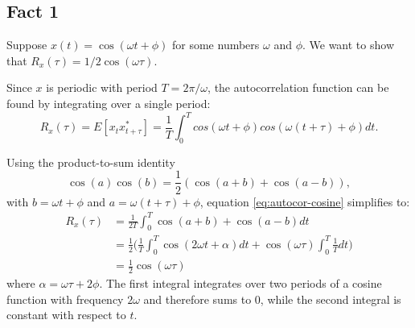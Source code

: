\documentclass{homework}
\begin{document}
\subsection{Fact 1}

Suppose $x(t) = \cos(\omega t + \phi)$ for some numbers $\omega$ and $\phi$.
We want to show that $R_x(\tau) = 1/2 \cos(\omega \tau)$.

Since $x$ is periodic with period $T=2\pi/\omega$, the autocorrelation function
can be found by integrating over a single period:
\begin{equation}
    R_x(\tau) = E[x_t x_{t+\tau}^*] = \frac{1}{T} \int_{0}^{T}
        cos(\omega t + \phi) cos(\omega(t + \tau) + \phi) dt.
        \label{eq:autocor-cosine}
\end{equation}

Using the product-to-sum identity
\begin{equation*}
    \cos(a) \cos(b) = \frac{1}{2} (\cos(a+b) + \cos(a - b)),
\end{equation*}
with $b = \omega t + \phi$ and $a=\omega(t + \tau) + \phi$, equation
\ref{eq:autocor-cosine} simplifies to:
\begin{align*}
    R_x(\tau) &= \frac{1}{2T} \int_{0}^{T} \cos(a+b) + \cos(a - b) dt \\
        &= \frac{1}{2} \biggl(\frac{1}{T} \int_{0}^{T} \cos(2\omega t + \alpha) dt
            + \cos (\omega \tau) \int_{0}^{T} \frac{1}{T} dt\biggr) \\
        &= \frac{1}{2} \cos(\omega \tau)
\end{align*}
where $\alpha = \omega \tau + 2 \phi$. The first integral integrates over two
periods of a cosine function with frequency $2\omega$ and therefore sums to 0,
while the second integral is constant with respect to $t$.
\end{document}

